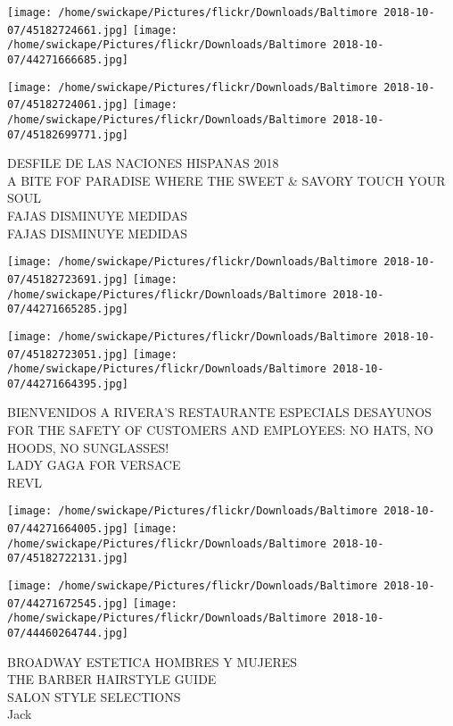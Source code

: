 \documentclass[10pt,letterpaper]{article}
\begin{document}
\texttt{[image: /home/swickape/Pictures/flickr/Downloads/Baltimore 2018-10-07/45182724661.jpg]}
\texttt{[image: /home/swickape/Pictures/flickr/Downloads/Baltimore 2018-10-07/44271666685.jpg]}

\texttt{[image: /home/swickape/Pictures/flickr/Downloads/Baltimore 2018-10-07/45182724061.jpg]}
\texttt{[image: /home/swickape/Pictures/flickr/Downloads/Baltimore 2018-10-07/45182699771.jpg]}

DESFILE DE LAS NACIONES HISPANAS 2018\\
A BITE FOF PARADISE WHERE THE SWEET \& SAVORY TOUCH YOUR SOUL\\
FAJAS DISMINUYE MEDIDAS\\
FAJAS DISMINUYE MEDIDAS\\
\pagebreak

\texttt{[image: /home/swickape/Pictures/flickr/Downloads/Baltimore 2018-10-07/45182723691.jpg]}
\texttt{[image: /home/swickape/Pictures/flickr/Downloads/Baltimore 2018-10-07/44271665285.jpg]}

\texttt{[image: /home/swickape/Pictures/flickr/Downloads/Baltimore 2018-10-07/45182723051.jpg]}
\texttt{[image: /home/swickape/Pictures/flickr/Downloads/Baltimore 2018-10-07/44271664395.jpg]}

BIENVENIDOS A RIVERA'S RESTAURANTE ESPECIALS DESAYUNOS\\
FOR THE SAFETY OF CUSTOMERS AND EMPLOYEES: NO HATS, NO HOODS, NO SUNGLASSES!\\
LADY GAGA FOR VERSACE\\
REVL\\
\pagebreak

\texttt{[image: /home/swickape/Pictures/flickr/Downloads/Baltimore 2018-10-07/44271664005.jpg]}
\texttt{[image: /home/swickape/Pictures/flickr/Downloads/Baltimore 2018-10-07/45182722131.jpg]}

\texttt{[image: /home/swickape/Pictures/flickr/Downloads/Baltimore 2018-10-07/44271672545.jpg]}
\texttt{[image: /home/swickape/Pictures/flickr/Downloads/Baltimore 2018-10-07/44460264744.jpg]}

BROADWAY ESTETICA HOMBRES Y MUJERES\\
THE BARBER HAIRSTYLE GUIDE\\
SALON STYLE SELECTIONS\\
Jack\\
\pagebreak
\end{document}
